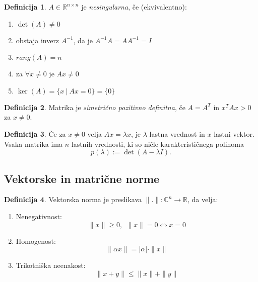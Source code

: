 \documentclass[11pt]{article}
\theoremstyle{definition}
\newtheorem{definicija}{Definicija}[section]
\begin{document}
\begin{definicija}

$A \in \mathbb{R}^{n \times n}$ je \textit{nesingularna}, če (ekvivalentno):
\begin{enumerate}
	\item[a)] $\det{(A)} \neq 0$
	\item[b)] obstaja inverz $A^{-1}$, da je $A^{-1}A = AA^{-1} = I$
	\item[c)] $rang{(A)} = n$
	\item[d)] za $\forall x \neq 0$ je $Ax \neq 0$
	\item[e)] $\ker{(A)} = \{x ~|~ Ax = 0\} = \{0\}$
\end{enumerate}

\end{definicija}
\vspace{0.5cm}

\begin{definicija}

Matrika je \textit{simetrično pozitivno definitna}, če $A = A^T$ in $x^T A x > 0$ za $x \neq 0$.

\end{definicija}
\vspace{0.5cm}

\begin{definicija}

Če za $x \neq 0$ velja $Ax = \lambda x$, je $\lambda$ lastna vrednost in $x$ lastni vektor. Vsaka matrika ima $n$ lastnih vrednosti, ki so ničle karakterističnega polinoma
$$p(\lambda) := \det{(A - \lambda I)}.$$

\end{definicija}
\vspace{0.5cm}


\subsection{Vektorske in matrične norme}
\vspace{0.5cm}

\begin{definicija}

Vektorska norma je preslikava $\|.\|: \mathbb{C}^n \rightarrow \mathbb{R}$, da velja:
\begin{enumerate}
	\item[1)] Nenegativnost: 
	$$\|x\| \geq 0, ~~\|x\| = 0 \Leftrightarrow x = 0$$
	\item[2)] Homogenost:
	$$\|\alpha x\| = |\alpha| \cdot \|x\|$$
	\item[3)] Trikotniška neenakost:
	$$\|x+y\| \leq \|x\| + \|y\|$$
\end{enumerate}

\end{definicija}
\vspace{0.5cm}
\end{document}
